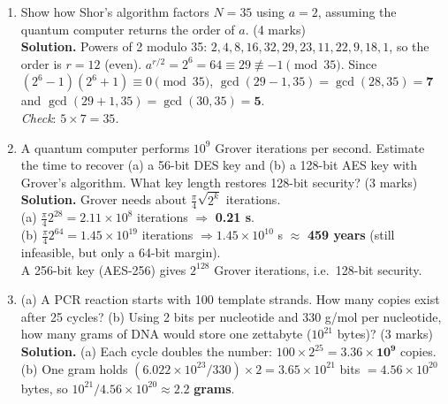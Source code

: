 \begin{enumerate}[leftmargin=1.6em,itemsep=4pt]
  \item Show how Shor's algorithm factors $N = 35$ using $a = 2$, assuming the quantum computer returns the order of $a$. \hfill (4 marks)\\
  \textbf{Solution.} Powers of 2 modulo 35: $2, 4, 8, 16, 32, 29, 23, 11, 22, 9, 18, 1$, so the order is $r = 12$ (even). $a^{r/2} = 2^6 = 64 \equiv 29 \not\equiv -1 \pmod{35}$. Since $(2^6 - 1)(2^6 + 1) \equiv 0 \pmod{35}$, $\gcd(29 - 1, 35) = \gcd(28, 35) = \mathbf{7}$ and $\gcd(29 + 1, 35) = \gcd(30, 35) = \mathbf{5}$.\\
  \emph{Check}: $5 \times 7 = 35$.

  \item A quantum computer performs $10^9$ Grover iterations per second. Estimate the time to recover (a) a 56-bit DES key and (b) a 128-bit AES key with Grover's algorithm. What key length restores 128-bit security? \hfill (3 marks)\\
  \textbf{Solution.} Grover needs about $\frac{\pi}{4}\sqrt{2^k}$ iterations.\\
  (a) $\frac{\pi}{4} 2^{28} = 2.11 \times 10^8$ iterations $\Rightarrow$ \textbf{0.21 s}.\\
  (b) $\frac{\pi}{4} 2^{64} = 1.45 \times 10^{19}$ iterations $\Rightarrow 1.45 \times 10^{10}$ s $\approx$ \textbf{459 years} (still infeasible, but only a 64-bit margin).\\
  A 256-bit key (AES-256) gives $2^{128}$ Grover iterations, i.e.\ 128-bit security.

  \item (a) A PCR reaction starts with 100 template strands. How many copies exist after 25 cycles? (b) Using 2 bits per nucleotide and 330 g/mol per nucleotide, how many grams of DNA would store one zettabyte ($10^{21}$ bytes)? \hfill (3 marks)\\
  \textbf{Solution.} (a) Each cycle doubles the number: $100 \times 2^{25} = \mathbf{3.36 \times 10^9}$ copies.\\
  (b) One gram holds $(6.022 \times 10^{23}/330) \times 2 = 3.65 \times 10^{21}$ bits $= 4.56 \times 10^{20}$ bytes, so $10^{21}/4.56 \times 10^{20} \approx \mathbf{2.2}$ \textbf{grams}.


\end{enumerate}
